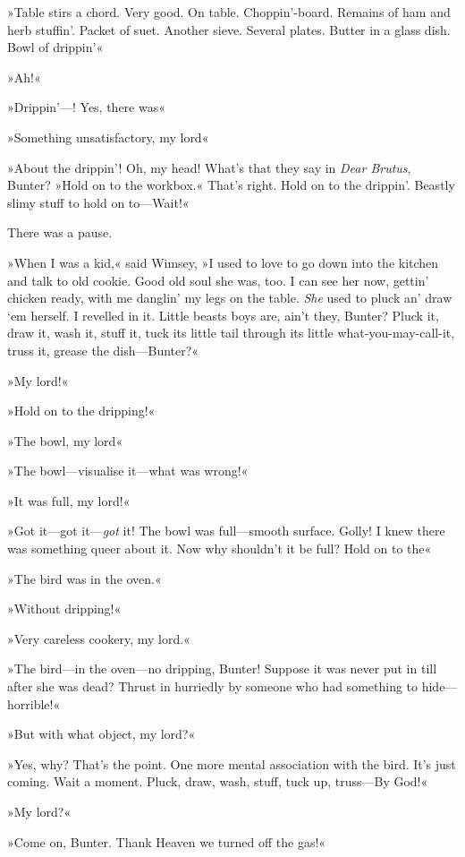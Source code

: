 »Table stirs a chord. Very good. On table. Choppin'-board. Remains of ham and herb stuffin'. Packet of suet. Another sieve. Several plates. Butter in a glass dish. Bowl of drippin'\longdash«

»Ah!«

»Drippin'—! Yes, there was\longdash«

»Something unsatisfactory, my lord\longdash«

»About the drippin'! Oh, my head! What's that they say in \textit{Dear Brutus}, Bunter? »Hold on to the workbox.« That's right. Hold on to the drippin'. Beastly slimy stuff to hold on to—Wait!«

There was a pause.

»When I was a kid,« said Wimsey, »I used to love to go down into the kitchen and talk to old cookie. Good old soul she was, too. I can see her now, gettin' chicken ready, with me danglin' my legs on the table. \textit{She} used to pluck an' draw `em herself. I revelled in it. Little beasts boys are, ain't they, Bunter? Pluck it, draw it, wash it, stuff it, tuck its little tail through its little what-you-may-call-it, truss it, grease the dish—Bunter?«

»My lord!«

»Hold on to the dripping!«

»The bowl, my lord\longdash«

»The bowl—visualise it—what was wrong!«

»It was full, my lord!«

»Got it—got it—\textit{got} it! The bowl was full—smooth surface. Golly! I knew there was something queer about it. Now why shouldn't it be full? Hold on to the\longdash«

»The bird was in the oven.«

»Without dripping!«

»Very careless cookery, my lord.«

»The bird—in the oven—no dripping, Bunter! Suppose it was never put in till after she was dead? Thrust in hurriedly by someone who had something to hide—horrible!«

»But with what object, my lord?«

»Yes, why? That's the point. One more mental association with the bird. It's just coming. Wait a moment. Pluck, draw, wash, stuff, tuck up, truss—By God!«

»My lord?«

»Come on, Bunter. Thank Heaven we turned off the gas!«

